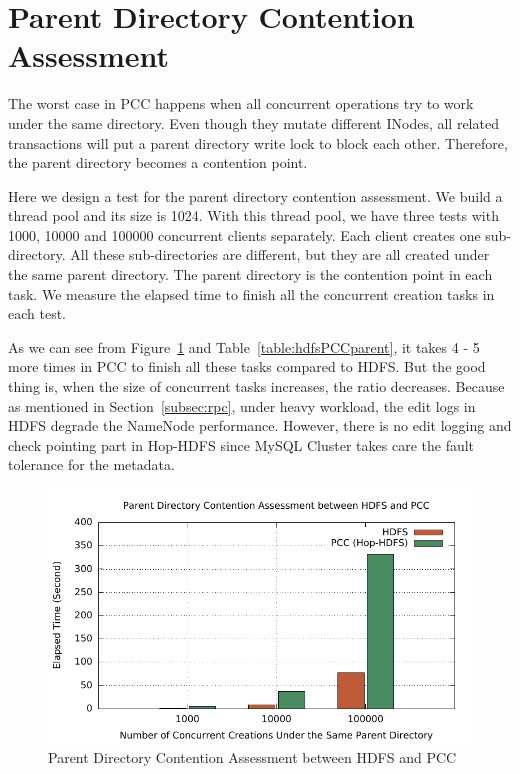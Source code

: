 \section{Parent Directory Contention Assessment}
\label{sec:pdcassement}
The worst case in PCC happens when all concurrent operations try to work under the same directory. Even though they mutate different INodes, all related transactions will put a parent directory write lock to block each other. Therefore, the parent directory becomes a contention point.

\noindent Here we design a test for the parent directory contention assessment. We build a thread pool and its size is 1024. With this thread pool, we have three tests with 1000, 10000 and 100000 concurrent clients separately. Each client creates one sub-directory. All these sub-directories are different, but they are all created under the same parent directory. The parent directory is the contention point in each task. We measure the elapsed time to finish all the concurrent creation tasks in each test.

\noindent As we can see from Figure~\ref{fig:hdfsPCCparent} and Table~\ref{table:hdfsPCCparent}, it takes 4 - 5 more times in PCC to finish all these tasks compared to HDFS. But the good thing is, when the size of concurrent tasks increases, the ratio decreases. Because as mentioned in Section~\ref{subsec:rpc}, under heavy workload, the edit logs in HDFS degrade the NameNode performance. However, there is no edit logging and check pointing part in Hop-HDFS since MySQL Cluster takes care the fault tolerance for the metadata.

\begin{figure}[h]
	\centering
	\includegraphics[width=\linewidth]{figs/hdfs_pcc_parentlock.pdf}
	\caption{Parent Directory Contention Assessment between HDFS and PCC}
	\label{fig:hdfsPCCparent}
\end{figure}

